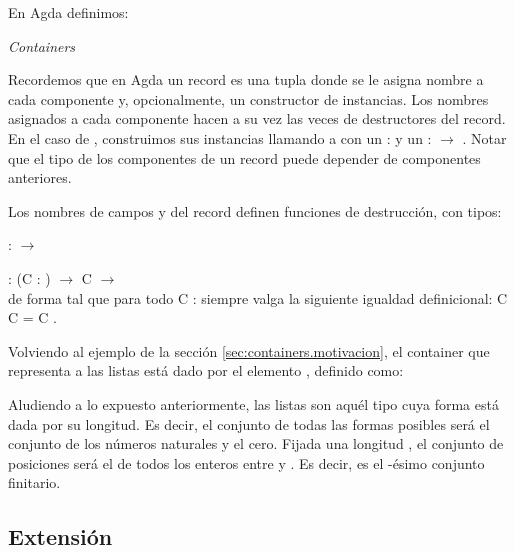 En Agda definimos: 

\begin{agdacode}\label{code:cont}{\it Containers}

\end{agdacode}

Recordemos que en Agda un record es una tupla donde se le asigna nombre a cada componente y, opcionalmente, un constructor de instancias. Los nombres asignados a cada componente hacen a su vez las veces de destructores del record.
En el caso de , construimos sus instancias llamando a  \AgdaInductiveConstructor{$\_\tri\_$} con un  :  y un  :  $\to$ . Notar que el tipo de los componentes de un record puede depender de componentes anteriores.

Los nombres de campos \Sh y \Pos del record  definen funciones de destrucción, con tipos:

\sangrar
\Sh :  $\to$ 

\sangrar
\Pos : (C : ) $\to$ \Sh C $\to$ \\
de forma tal que para todo C :  siempre valga la siguiente igualdad definicional: \Sh C \AgdaInductiveConstructor{$\tri$} \Pos C = C .

\begin{example}
Volviendo al ejemplo de la sección \ref{sec:containers.motivacion},
el container que representa a las listas está dado por el elemento , definido como:


Aludiendo a lo expuesto anteriormente, las listas son aquél tipo cuya forma está dada por su longitud. Es decir, el conjunto de todas las formas posibles será el conjunto de los números naturales y el cero. Fijada una longitud , el conjunto de posiciones será el de todos los enteros entre  y . Es decir, es el -ésimo conjunto finitario.
\end{example}

 
\subsection{Extensión}
  
